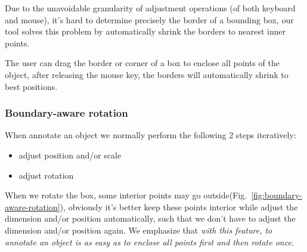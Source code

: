 \documentclass[letterpaper, 10 pt, conference]{ieeeconf}  %
\begin{document}
Due to the unavoidable granularity of adjustment operations (of both keyboard and mouse), it's hard to determine precisely the border of a bounding box, our tool solves this problem by automatically shrink the borders to nearest inner points.

The user can drag the border or corner of a box to enclose all points of the object, after releasing the mouse key, the borders will automatically shrink to best positions.

\subsubsection{Boundary-aware rotation}

When annotate an object we normally perform the following 2 steps iteratively:
\begin{itemize}
	\item adjust position and/or scale
	\item adjust rotation	
\end{itemize}

When we rotate the box, some interior points may go outside(Fig.~\ref{fig:boundary-aware-rotation}), obviously it's better keep these points interior while adjust the dimension and/or position automatically, such that we don't have to adjust the dimension and/or position again. We emphasize that \emph{with this feature, to annotate an object is as easy as to enclose all points first and then rotate once}.

\end{document}
